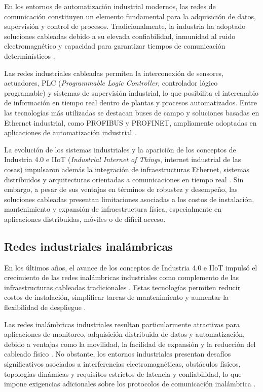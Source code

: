 En los entornos de automatización industrial modernos, las redes de comunicación constituyen un elemento fundamental para la adquisición de datos, supervisión y control de procesos. Tradicionalmente, la industria ha adoptado soluciones cableadas debido a su elevada confiabilidad, inmunidad al ruido electromagnético y capacidad para garantizar tiempos de comunicación determinísticos \cite{future_industrial_communication,communication_technology_i40}.

Las redes industriales cableadas permiten la interconexión de sensores, actuadores, PLC (\textit{Programmable Logic Controller}, controlador lógico programable) y sistemas de supervisión industrial, lo que posibilita el intercambio de información en tiempo real dentro de plantas y procesos automatizados. Entre las tecnologías más utilizadas se destacan buses de campo y soluciones basadas en Ethernet industrial, como PROFIBUS y PROFINET, ampliamente adoptadas en aplicaciones de automatización industrial \cite{profibus_official,profinet_official}.

La evolución de los sistemas industriales y la aparición de los conceptos de Industria 4.0 e IIoT (\textit{Industrial Internet of Things}, internet industrial de las cosas) impulsaron además la integración de infraestructuras Ethernet, sistemas distribuidos y arquitecturas orientadas a comunicaciones en tiempo real \cite{future_industrial_communication}. Sin embargo, a pesar de sus ventajas en términos de robustez y desempeño, las soluciones cableadas presentan limitaciones asociadas a los costos de instalación, mantenimiento y expansión de infraestructura física, especialmente en aplicaciones distribuidas, móviles o de difícil acceso.

\subsection{Redes industriales inalámbricas}

En los últimos años, el avance de los conceptos de Industria 4.0 e IIoT impulsó el crecimiento de las redes inalámbricas industriales como complemento de las infraestructuras cableadas tradicionales \cite{review_iwn_industry40}. Estas tecnologías permiten reducir costos de instalación, simplificar tareas de mantenimiento y aumentar la flexibilidad de despliegue \cite{emerson_wireless,phoenix_trusted_wireless,scalance_wireless}.

Las redes inalámbricas industriales resultan particularmente atractivas para aplicaciones de monitoreo, adquisición distribuida de datos y automatización, debido a ventajas como la movilidad, la facilidad de expansión y la reducción del cableado físico \cite{review_iwn_industry40}. No obstante, los entornos industriales presentan desafíos significativos asociados a interferencias electromagnéticas, obstáculos físicos, topologías dinámicas y requisitos estrictos de latencia y confiabilidad, lo que impone exigencias adicionales sobre los protocolos de comunicación inalámbrica \cite{review_iwn_industry40}.


